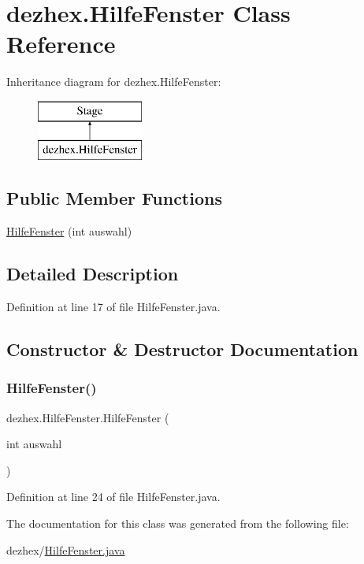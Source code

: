 \hypertarget{classdezhex_1_1_hilfe_fenster}{}\section{dezhex.\+Hilfe\+Fenster Class Reference}
\label{classdezhex_1_1_hilfe_fenster}
Inheritance diagram for dezhex.\+Hilfe\+Fenster\+:\begin{figure}[H]
\begin{center}
\leavevmode
\includegraphics[height=2.000000cm]{classdezhex_1_1_hilfe_fenster}
\end{center}
\end{figure}
\subsection*{Public Member Functions}
\begin{DoxyCompactItemize}
\item 
\hyperlink{classdezhex_1_1_hilfe_fenster_ad24f38e5ef3de17205242d57b7fab65a}{Hilfe\+Fenster} (int auswahl)
\end{DoxyCompactItemize}


\subsection{Detailed Description}


Definition at line 17 of file Hilfe\+Fenster.\+java.



\subsection{Constructor \& Destructor Documentation}
\mbox{\label{classdezhex_1_1_hilfe_fenster_ad24f38e5ef3de17205242d57b7fab65a}} 
\subsubsection{\texorpdfstring{Hilfe\+Fenster()}{HilfeFenster()}}
{\footnotesize\ttfamily dezhex.\+Hilfe\+Fenster.\+Hilfe\+Fenster (\begin{DoxyParamCaption}\item[{int}]{auswahl }\end{DoxyParamCaption})}



Definition at line 24 of file Hilfe\+Fenster.\+java.



The documentation for this class was generated from the following file\+:\begin{DoxyCompactItemize}
\item 
dezhex/\hyperlink{_hilfe_fenster_8java}{Hilfe\+Fenster.\+java}\end{DoxyCompactItemize}
